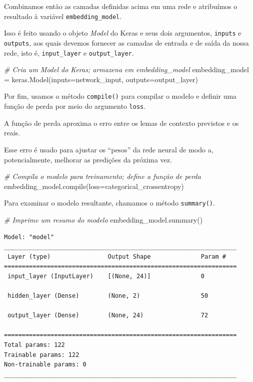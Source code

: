 \documentclass[
  brazilian,
]{article}
\newenvironment{Shaded}{}{}
\newcommand{\BuiltInTok}[1]{#1}
\newcommand{\CommentTok}[1]{\textcolor[rgb]{0.38,0.63,0.69}{\textit{#1}}}
\newcommand{\NormalTok}[1]{#1}
\newcommand{\OperatorTok}[1]{\textcolor[rgb]{0.40,0.40,0.40}{#1}}
\newcommand{\StringTok}[1]{\textcolor[rgb]{0.25,0.44,0.63}{#1}}
\begin{document}
Combinamos então as camadas definidas acima em uma rede e atribuímos o
resultado à variável \texttt{embedding\_model}.

Isso é feito usando o objeto \emph{Model} do Keras e seus dois
argumentos, \texttt{inputs} e \texttt{outputs}, aos quais devemos
fornecer as camadas de entrada e de saída da nossa rede, isto é,
\texttt{input\_layer} e \texttt{output\_layer}.

\begin{Shaded}
\begin{Highlighting}[]
\CommentTok{\# Cria um Model do Keras; armazena em \textquotesingle{}embedding\_model\textquotesingle{}}
\NormalTok{embedding\_model }\OperatorTok{=}\NormalTok{ keras.Model(inputs}\OperatorTok{=}\NormalTok{network\_input, outputs}\OperatorTok{=}\NormalTok{output\_layer)}
\end{Highlighting}
\end{Shaded}

Por fim, usamos o método \texttt{compile()} para compilar o modelo e
definir uma função de perda por meio do argumento \texttt{loss}.

A função de perda aproxima o erro entre os lemas de contexto previstos e
os reais.

Esse erro é usado para ajustar os ``pesos'' da rede neural de modo a,
potencialmente, melhorar as predições da próxima vez.

\begin{Shaded}
\begin{Highlighting}[]
\CommentTok{\# Compila o modelo para treinamento; define a função de perda}
\NormalTok{embedding\_model.}\BuiltInTok{compile}\NormalTok{(loss}\OperatorTok{=}\StringTok{\textquotesingle{}categorical\_crossentropy\textquotesingle{}}\NormalTok{)}
\end{Highlighting}
\end{Shaded}

Para examinar o modelo resultante, chamamos o método \texttt{summary()}.

\begin{Shaded}
\begin{Highlighting}[]
\CommentTok{\# Imprime um resumo do modelo}
\NormalTok{embedding\_model.summary()}
\end{Highlighting}
\end{Shaded}

\begin{verbatim}
Model: "model"
_________________________________________________________________
 Layer (type)                Output Shape              Param #
=================================================================
 input_layer (InputLayer)    [(None, 24)]              0

 hidden_layer (Dense)        (None, 2)                 50

 output_layer (Dense)        (None, 24)                72

=================================================================
Total params: 122
Trainable params: 122
Non-trainable params: 0
_________________________________________________________________
\end{verbatim}
\end{document}
